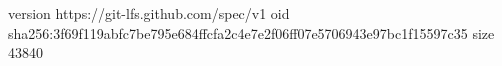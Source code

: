 version https://git-lfs.github.com/spec/v1
oid sha256:3f69f119abfc7be795e684ffcfa2c4e7e2f06ff07e5706943e97bc1f15597c35
size 43840
